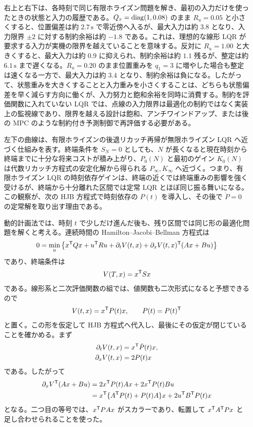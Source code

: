 右上と右下は、各時刻で同じ有限ホライズン問題を解き、最初の入力だけを使ったときの状態と入力の履歴である。$Q_x=\operatorname{diag}(1,0.08)$ のまま $R_u=0.05$ と小さくすると、位置偏差は約 $2.7\,\mathrm{s}$ で零近傍へ入るが、最大入力は約 $3.8$ となり、入力限界 $\pm 2$ に対する制約余裕は約 $-1.8$ である。これは、理想的な線形 LQR が要求する入力が実機の限界を越えていることを意味する。反対に $R_u=1.00$ と大きくすると、最大入力は約 $0.9$ に抑えられ、制約余裕は約 $1.1$ 残るが、整定は約 $6.1\,\mathrm{s}$ まで遅くなる。$R_u=0.20$ のまま位置重みを $q_1=3$ に増やした場合も整定は速くなる一方で、最大入力は約 $3.4$ となり、制約余裕は負になる。したがって、状態重みを大きくすることと入力重みを小さくすることは、どちらも状態偏差を早く減らす方向に働くが、入力努力と飽和余裕を同時に消費する。制約を評価関数に入れていない LQR では、点線の入力限界は最適化の制約ではなく実装上の監視線であり、限界を越える設計は飽和、アンチワインドアップ、または後の MPC のような制約付き予測制御で再評価する必要がある。

左下の曲線は、有限ホライズンの後退リカッチ再帰が無限ホライズン LQR へ近づく仕組みを表す。終端条件を $S_N=0$ としても、$N$ が長くなると現在時刻から終端までに十分な将来コストが積み上がり、$P_0(N)$ と最初のゲイン $K_0(N)$ は代数リカッチ方程式の安定化解から得られる $P_\infty,K_\infty$ へ近づく。つまり、有限ホライズン LQR の時刻依存ゲインは、終端の近くでは終端重みの影響を強く受けるが、終端から十分離れた区間では定常 LQR とほぼ同じ振る舞いになる。この観察が、次の HJB 方程式で時刻依存の $P(t)$ を導入し、その後で $\dot{P}=0$ の定常解を取り出す理由である。

動的計画法では、時刻 $t$ で少しだけ進んだ後も、残り区間では同じ形の最適化問題を解くと考える。連続時間の Hamilton--Jacobi--Bellman 方程式は
\begin{equation}
  0=\min_u
  \left\{
    x^{\mathsf{T}} Qx+u^{\mathsf{T}} Ru
    +\partial_t V(t,x)
    +\partial_x V(t,x)^{\mathsf{T}}(Ax+Bu)
  \right\}
  \label{eq:finite-lqr-hjb}
\end{equation}
であり、終端条件は
\begin{equation}
  V(T,x)=x^{\mathsf{T}} S x
  \label{eq:finite-lqr-terminal-value}
\end{equation}
である。線形系と二次評価関数の組では、値関数も二次形式になると予想できるので
\begin{equation}
  V(t,x)=x^{\mathsf{T}} P(t)x,
  \qquad P(t)=P(t)^{\mathsf{T}}
  \label{eq:finite-lqr-ansatz}
\end{equation}
と置く。この形を仮定して HJB 方程式へ代入し、最後にその仮定が閉じていることを確かめる。まず
\begin{align}
  \partial_t V(t,x)&=x^{\mathsf{T}} \dot{P}(t)x,\\
  \partial_x V(t,x)&=2P(t)x
\end{align}
である。したがって
\begin{align}
  \partial_x V^{\mathsf{T}}(Ax+Bu)
  &=2x^{\mathsf{T}} P(t)Ax+2x^{\mathsf{T}} P(t)Bu\\
  &=x^{\mathsf{T}}\{A^{\mathsf{T}} P(t)+P(t)A\}x+2u^{\mathsf{T}} B^{\mathsf{T}} P(t)x
\end{align}
となる。二つ目の等号では、$x^{\mathsf{T}} P A x$ がスカラーであり、転置して $x^{\mathsf{T}} A^{\mathsf{T}} P x$ と足し合わせられることを使った。

